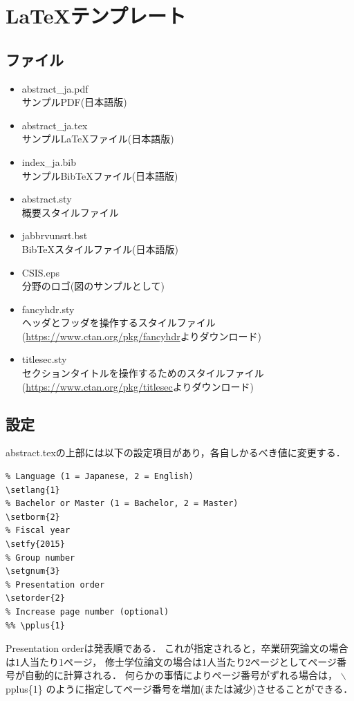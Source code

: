 \documentclass[a4paper,twoside,twocolumn,10pt]{article}
\begin{document}
\section{LaTeXテンプレート}
\subsection{ファイル}
\begin{itemize}
\item abstract\_ja.pdf\\
  サンプルPDF(日本語版)
\item abstract\_ja.tex\\
  サンプルLaTeXファイル(日本語版)
\item index\_ja.bib\\
  サンプルBibTeXファイル(日本語版)
\item abstract.sty\\
  概要スタイルファイル
\item jabbrvunsrt.bst\\
  BibTeXスタイルファイル(日本語版)
\item CSIS.eps\\
  分野のロゴ(図のサンプルとして)
\item fancyhdr.sty\\
  ヘッダとフッダを操作するスタイルファイル
  (\url{https://www.ctan.org/pkg/fancyhdr}よりダウンロード)
\item titlesec.sty\\
  セクションタイトルを操作するためのスタイルファイル
  (\url{https://www.ctan.org/pkg/titlesec}よりダウンロード)
\end{itemize}

\subsection{設定}
abstract.texの上部には以下の設定項目があり，各自しかるべき値に変更する．
%
\begin{verbatim}
% Language (1 = Japanese, 2 = English)
\setlang{1}
% Bachelor or Master (1 = Bachelor, 2 = Master)
\setborm{2}
% Fiscal year
\setfy{2015}
% Group number
\setgnum{3}
% Presentation order
\setorder{2}
% Increase page number (optional)
%% \pplus{1}
\end{verbatim}
%
Presentation orderは発表順である．
これが指定されると，卒業研究論文の場合は1人当たり1ページ，
修士学位論文の場合は1人当たり2ページとしてページ番号が自動的に計算される．
何らかの事情によりページ番号がずれる場合は，
$\backslash$pplus\{1\}
のように指定してページ番号を増加(または減少)させることができる．
\end{document}
